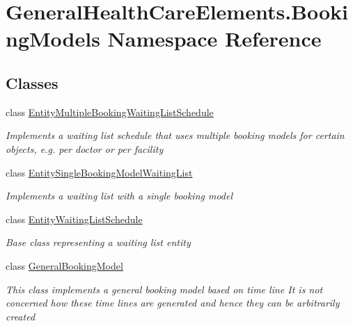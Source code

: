 \hypertarget{namespace_general_health_care_elements_1_1_booking_models}{}\section{General\+Health\+Care\+Elements.\+Booking\+Models Namespace Reference}
\label{namespace_general_health_care_elements_1_1_booking_models}
\subsection*{Classes}
\begin{DoxyCompactItemize}
\item 
class \hyperlink{class_general_health_care_elements_1_1_booking_models_1_1_entity_multiple_booking_waiting_list_schedule}{Entity\+Multiple\+Booking\+Waiting\+List\+Schedule}
\begin{DoxyCompactList}\small\item\em Implements a waiting list schedule that uses multiple booking models for certain objects, e.\+g. per doctor or per facility \end{DoxyCompactList}\item 
class \hyperlink{class_general_health_care_elements_1_1_booking_models_1_1_entity_single_booking_model_waiting_list}{Entity\+Single\+Booking\+Model\+Waiting\+List}
\begin{DoxyCompactList}\small\item\em Implements a waiting list with a single booking model \end{DoxyCompactList}\item 
class \hyperlink{class_general_health_care_elements_1_1_booking_models_1_1_entity_waiting_list_schedule}{Entity\+Waiting\+List\+Schedule}
\begin{DoxyCompactList}\small\item\em Base class representing a waiting list entity \end{DoxyCompactList}\item 
class \hyperlink{class_general_health_care_elements_1_1_booking_models_1_1_general_booking_model}{General\+Booking\+Model}
\begin{DoxyCompactList}\small\item\em This class implements a general booking model based on time line It is not concerned how these time lines are generated and hence they can be arbitrarily created \end{DoxyCompactList}\item 

\end{DoxyCompactItemize}
